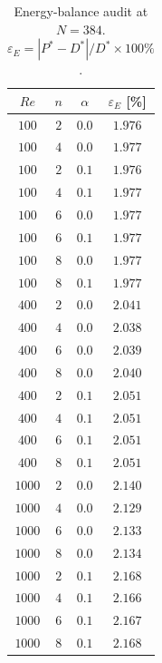 \begin{table}[!htbp]
\centering
\caption{Energy-balance audit at $N=384$. $\varepsilon_E = |P^*-D^*|/D^* \times 100\%$.}
\label{supptab:balance}
\begin{tabular}{@{}cccc@{}}
\hline
$Re$ & $n$ & $\alpha$ & $\varepsilon_E$ [\%] \\
\hline
$100$  & $2$ & $0.0$  & $1.976$ \\
$100$  & $4$ & $0.0$  & $1.977$ \\
$100$  & $2$ & $0.1$  & $1.976$ \\
$100$  & $4$ & $0.1$  & $1.977$ \\
$100$  & $6$ & $0.0$  & $1.977$ \\
$100$  & $6$ & $0.1$  & $1.977$ \\
$100$  & $8$ & $0.0$  & $1.977$ \\
$100$  & $8$ & $0.1$  & $1.977$ \\
$400$  & $2$ & $0.0$  & $2.041$ \\
$400$  & $4$ & $0.0$  & $2.038$ \\
$400$  & $6$ & $0.0$  & $2.039$ \\
$400$  & $8$ & $0.0$  & $2.040$ \\
$400$  & $2$ & $0.1$  & $2.051$ \\
$400$  & $4$ & $0.1$  & $2.051$ \\
$400$  & $6$ & $0.1$  & $2.051$ \\
$400$  & $8$ & $0.1$  & $2.051$ \\
$1000$ & $2$ & $0.0$  & $2.140$ \\
$1000$ & $4$ & $0.0$  & $2.129$ \\
$1000$ & $6$ & $0.0$  & $2.133$ \\
$1000$ & $8$ & $0.0$  & $2.134$ \\
$1000$ & $2$ & $0.1$  & $2.168$ \\
$1000$ & $4$ & $0.1$  & $2.166$ \\
$1000$ & $6$ & $0.1$  & $2.167$ \\
$1000$ & $8$ & $0.1$  & $2.168$ \\
\hline
\end{tabular}
\end{table}

